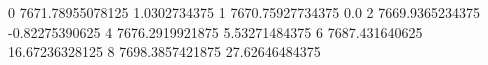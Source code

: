 0 7671.78955078125 1.0302734375
1 7670.75927734375 0.0
2 7669.9365234375 -0.82275390625
4 7676.2919921875 5.53271484375
6 7687.431640625 16.67236328125
8 7698.3857421875 27.62646484375
